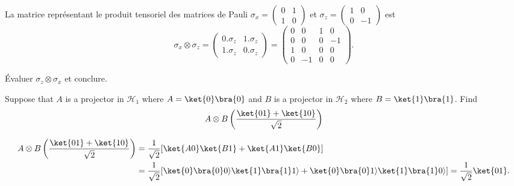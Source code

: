 \begin{example}\label{expl:tensoOp}
La matrice représentant le produit tensoriel des matrices de Pauli $\sigma
_{x}=\begin{pmatrix}
0 & 1\\
1 & 0
\end{pmatrix}$ et $\sigma_{z}=\begin{pmatrix}
1 & 0\\
0 & -1
\end{pmatrix}$ est%
\begin{equation}
\sigma_{x}\otimes\sigma_{z}=\begin{pmatrix}
0.\sigma_{z} & 1.\sigma_{z}\\
1.\sigma_{z} & 0.\sigma_{z}
\end{pmatrix}
=\begin{pmatrix}
0 & 0 & 1 & 0\\
0 & 0 & 0 & -1\\
1 & 0 & 0 & 0\\
0 & -1 & 0 & 0
\end{pmatrix}.
\end{equation}

\end{example}

\begin{exercise}
 Évaluer $\sigma_{z}\otimes\sigma_{x}$ et conclure.
\end{exercise}
\begin{exercise}
 Suppose that $A$ is a projector in $\mathcal{H}_{1}$ where $A=\ket{0}\bra{0}$
and $B$ is a projector in $\mathcal{H}_{2}$ where $B=\ket{1}\bra{1}$. Find
\begin{equation}
 A\otimes B\left( \frac{\ket{01}+\ket{10}}{\sqrt{2}}\right)
\end{equation}
\end{exercise}
\begin{footnotesize}
\begin{solution}
\begin{equation}
 \begin{split}
A\otimes B\left( \frac{\ket{01}+\ket{10}}{\sqrt{2}}\right) & =
\frac{1}{\sqrt{2}}[\ket{A0}\ket{B1}+\ket{A1}\ket{B0}]\\
& =\frac{1}{\sqrt{2}}[\ket{0}\bra{0}0\rangle\ket{1}\bra{1}1\rangle+\ket{0}\bra
{0}1\rangle\ket{1}\bra{1}0\rangle]=\frac{1}{\sqrt{2}}\ket{01}.
\end{split}
\end{equation}
\end{solution}
\end{footnotesize}

